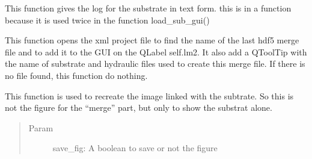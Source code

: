 \documentclass[letterpaper,10pt,english]{sphinxmanual}
\begin{document}
\begin{fulllineitems}
\begin{fulllineitems}
\begin{quote}
\begin{description}
\end{description}\end{quote}

\end{fulllineitems}


\begin{fulllineitems}
\label{\detokenize{index:src_GUI.hydro_GUI_2.SubstrateW.log_txt}}
This function gives the log for the substrate in text form. this is in a function because it is used twice in
the function load\_sub\_gui()

\end{fulllineitems}


\begin{fulllineitems}
\label{\detokenize{index:src_GUI.hydro_GUI_2.SubstrateW.name_last_merge}}
This function opens the xml project file to find the name of the last hdf5 merge file and to add it
to the GUI on the QLabel self.lm2. It also add a QToolTip with the name of substrate and hydraulic files used
to create this merge file. If there is no file found, this function do nothing.

\end{fulllineitems}


\begin{fulllineitems}
\label{\detokenize{index:src_GUI.hydro_GUI_2.SubstrateW.recreate_image_sub}}
This function is used to recreate the image linked with the subtrate. So this is not the figure for the ``merge''
part, but only to show the substrat alone.
\begin{quote}\begin{description}
\item[{Param}] \leavevmode
save\_fig: A boolean to save or not the figure

\end{description}\end{quote}

\end{fulllineitems}


\end{fulllineitems}
\end{document}
